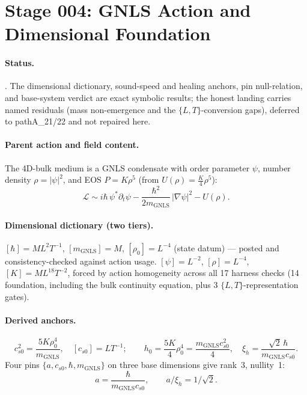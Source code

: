 \section{Stage 004: GNLS Action and Dimensional Foundation}

\claimstatus{\StatusExactClosure}

\paragraph{Status.}
\StatusExactClosure. The dimensional dictionary, sound-speed and healing anchors,
pin null-relation, and base-system verdict are exact symbolic results; the honest
landing carries named residuals (mass non-emergence and the \(\{L,T\}\)-conversion
gaps), deferred to pathA\_21/22 and not repaired here.

\paragraph{Parent action and field content.}
The 4D-bulk medium is a GNLS condensate with order parameter \(\psi\), number
density \(\rho=|\psi|^2\), and EOS \(P=K\rho^5\) (from \(U(\rho)=\tfrac{K}{4}\rho^5\)):
\[
  \mathcal{L}\sim i\hbar\,\psi^{*}\partial_t\psi
  -\frac{\hbar^2}{2m_{\mathrm{GNLS}}}\,|\nabla\psi|^2 - U(\rho).
\]

\paragraph{Dimensional dictionary (two tiers).}
 \([\hbar]=ML^{2}T^{-1}\),
\([m_{\mathrm{GNLS}}]=M\), \([\rho_0]=L^{-4}\) (state datum) --- posted and
consistency-checked against action usage. 
\([\psi]=L^{-2}\), \([\rho]=L^{-4}\), \([K]=ML^{18}T^{-2}\), forced by action
homogeneity across all 17 harness checks (14 foundation, including the bulk
continuity equation, plus 3 \(\{L,T\}\)-representation gates).

\paragraph{Derived anchors.}
\[
  c_{s0}^{2}=\frac{5K\rho_0^{4}}{m_{\mathrm{GNLS}}},\quad [c_{s0}]=LT^{-1};
  \qquad
  h_0=\frac{5K}{4}\rho_0^{4}=\frac{m_{\mathrm{GNLS}}c_{s0}^{2}}{4},\quad
  \xi_h=\frac{\sqrt{2}\,\hbar}{m_{\mathrm{GNLS}}c_{s0}}.
\]
 Four pins
\(\{a,c_{s0},\hbar,m_{\mathrm{GNLS}}\}\) on three base dimensions give rank~3,
nullity~1:
\[
  a=\frac{\hbar}{m_{\mathrm{GNLS}}c_{s0}},\qquad a/\xi_h=1/\sqrt{2}.
\]

